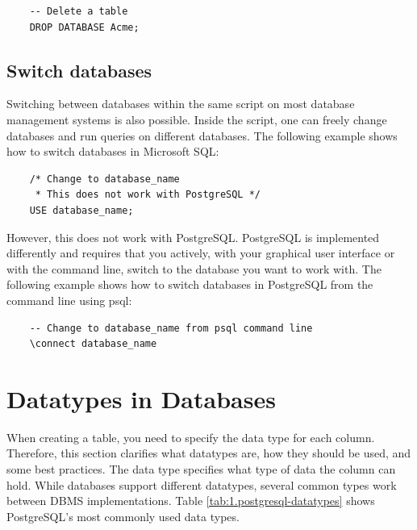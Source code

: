 \begin{verbatim}
    -- Delete a table
    DROP DATABASE Acme;
\end{verbatim}

\subsection{Switch databases}
Switching between databases within the same script on most database management systems is also possible. Inside the script, one can freely change databases and run queries on different databases. The following example shows how to switch databases in Microsoft SQL:

\begin{verbatim}
    /* Change to database_name
     * This does not work with PostgreSQL */
    USE database_name;
\end{verbatim}

However, this does not work with PostgreSQL. PostgreSQL is implemented differently and requires that you actively, with your graphical user interface or with the command line, switch to the database you want to work with. The following example shows how to switch databases in PostgreSQL from the command line using psql:

\begin{verbatim}
    -- Change to database_name from psql command line
    \connect database_name
\end{verbatim}

\section{Datatypes in Databases}
When creating a table, you need to specify the data type for each column. Therefore, this section clarifies what datatypes are, how they should be used, and some best practices. The data type specifies what type of data the column can hold. While databases support different datatypes, several common types work between DBMS implementations. Table \ref{tab:1.postgresql-datatypes} shows PostgreSQL's most commonly used data types.

